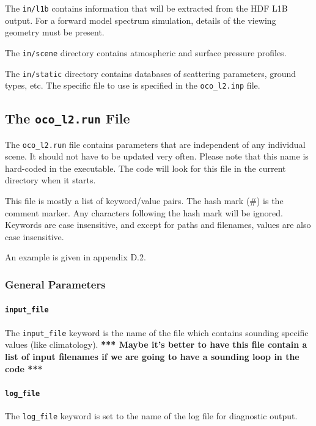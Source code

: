 \documentclass{article}
\begin{document}
The \texttt{in/l1b} contains information that will be extracted from
the HDF L1B output.  For a forward model spectrum simulation, details
of the viewing geometry must be present.

The \texttt{in/scene} directory contains atmospheric and surface
pressure profiles.  
 
The \texttt{in/static} directory contains databases of scattering
parameters, ground types, etc.  The specific file to use is specified
in the \texttt{oco\_l2.inp} file.

\subsection{The \texttt{oco\_l2.run} File}

The \texttt{oco\_l2.run} file contains parameters that are independent
of any individual scene.  It should not have to be updated very
often.  Please note that this name is hard-coded in the executable.
The code will look for this file in the current directory when it starts.

This file is mostly a list of keyword/value pairs.  The hash mark (\#)
is the comment marker.  Any characters following the hash mark will be
ignored.  Keywords are case insensitive, and except for paths and
filenames, values are also case insensitive.

An example is given in appendix D.2.

\subsubsection{General Parameters}

\paragraph{\texttt{input\_file}}

The \texttt{input\_file} keyword is the name of the file which
contains sounding specific values (like climatology).  \textbf{***
Maybe it's better to have this file contain a list of input filenames
if we are going to have a sounding loop in the code ***}

\paragraph{\texttt{log\_file}}

The \texttt{log\_file} keyword is set to the name of the log file for
diagnostic output.
\end{document}

